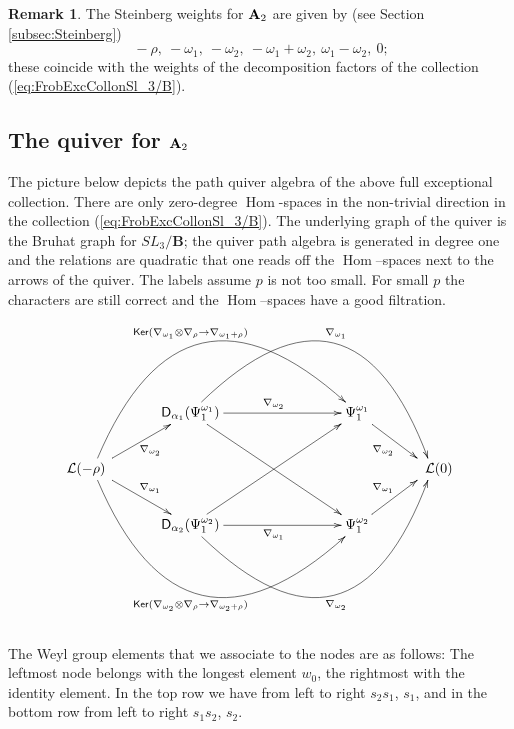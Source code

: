 \documentclass[sn-mathphys-num]{sn-jnl}%
\newcommand{\Ll}{\mathcal L}
\newcommand*{\Hom}{\mathop{\mathrm {Hom}}\nolimits}
\newcommand{\sd}{\sf D}
\newcommand{\fb}{\mathbf B}
\theoremstyle{definition}
\newtheorem{remark}[theorem]{Remark}
\begin{document}
\begin{remark}\label{rem:SteinbergA_2}
{The Steinberg weights for ${\bf A}_2$ are given by (see Section \ref{subsec:Steinberg})
$$\ -\rho, \ -\omega _1, \ -\omega _2, \ -\omega _1+\omega _2, \ \omega _1-\omega _2, \ 0;$$
these coincide with the weights of the decomposition factors of the collection (\ref{eq:FrobExcCollonSl_3/B}).
}
\end{remark}

\subsection{ The quiver for ${\bf A}_2$}

The picture below depicts the path quiver algebra of the above full exceptional collection. There are only zero-degree $\Hom$-spaces in the non-trivial direction in the collection (\ref{eq:FrobExcCollonSl_3/B}). The underlying graph of the quiver is the Bruhat graph for $SL_3/{\fb}$; the quiver path algebra is generated in degree one and the relations are quadratic that one reads off the $\Hom$--spaces next to the arrows of the quiver.
The labels assume $p$ is not too small. For small $p$ the characters are still correct and the $\Hom$--spaces have a good filtration.

\begin{equation}
\xymatrix{
& {\sd }_{\alpha _1}(\Psi _1^{\omega _1})\ar@/^6pc/[rrrrd]^{\nabla _{\omega _1}}\ar[rrrdd]\ar[rrr]^{\nabla _{\omega _2}} & & & \Psi _1^{\omega _1}\ar[rd]_{\nabla _{\omega _2}}  \\
\Ll (-\rho) \ar@/^6pc/[rrrru]^{{\sf Ker}(\nabla _{\omega _1}\otimes \nabla _{\rho}\rightarrow \nabla _{\omega _1+\rho})
}\ar@/_6pc/[rrrrd]_{{\sf Ker}(\nabla _{\omega _2}\otimes \nabla _{\rho}\rightarrow \nabla _{\omega _2+\rho})}\ar[rd]^{\nabla _{\omega _1}}\ar[ru]_{\nabla _{\omega _2}}  \quad  &   & &  &  &  \quad \Ll (0) \\
& {\sd }_{\alpha _2}(\Psi _1^{\omega _2})\ar@/_6pc/[rrrru]_{\nabla _{\omega _2}}\ar[rrruu]\ar[rrr]_{\nabla _{\omega _1}}  &   & & \Psi _1^{\omega _2}\ar[ru]^{\nabla _{\omega _1}} \\
}
\end{equation}\\
The Weyl group elements that we associate to the nodes are
as follows: The leftmost node belongs with the longest element $w_0$, the rightmost with the identity element. In the top row we have from left to right 
$s_2 s_1$, $s_1$, 
and in the bottom row from left to right
$s_1 s_2$, 
$s_2 $. 
\end{document}
